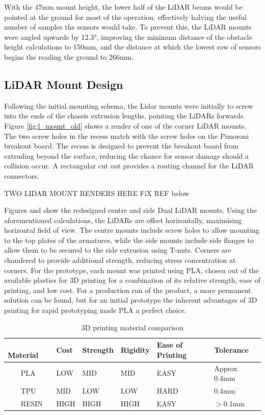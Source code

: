 \documentclass [12pt]{article}
\begin{document}
With the 47mm mount height, the lower half of the LiDAR beams would be pointed at the ground for most of the operation, effectively halving the useful number of samples the sensors would take. To prevent this, the LiDAR mounts were angled upwards by 12.3°,  improving the minimum distance of the obstacle height calculations to 150mm, and the distance at which the lowest row of sensors begins the reading the ground to 266mm.
\subsection{LiDAR Mount Design}


Following the initial mounting schema, the Lidar mounts were initially to screw into the ends of the chassis extrusion lengths, pointing the LiDARs forwards. Figure \ref{fig:l_mount_old} shows a render of one of the corner LiDAR mounts. The two screw holes in the recess match with the screw holes on the Pimoroni breakout board. The recess is designed to prevent the breakout board from extruding beyond the surface, reducing the chance for sensor damage should a collision occur. A rectangular cut out provides a routing channel for the LiDAR connectors.

TWO LIDAR MOUNT RENDERS HERE FiX REF below

Figures  and  show the redesigned centre and side Dual LiDAR mounts. Using the aforementioned calculations, the LiDARs are offset horizontally, maximising horizontal field of view. The centre mounts include screw holes to allow mounting to the top plates of the armatures, while the side mounts include side flanges to allow them to be secured to the side extrusion using T-nuts. Corners are chamfered to provide additional strength, reducing stress concentration at corners\cite{BELINGARDI2002273}.
For the prototype, each mount was printed using PLA, chosen out of the available plastics for 3D printing for a combination of its relative strength, ease of printing, and low cost. For a production run of the product, a more permanent solution can be found, but for an initial prototype the inherent advantages of 3D printing for rapid prototyping made PLA a perfect choice.

\begin{table}
    \begin{tabular}
    {|p{2.1cm}|p{1.8cm}|p{2.1cm}|p{2.1cm}|p{3.1cm}|p{3.2cm}|}
    \hline
        Material & Cost & Strength & Rigidity & Ease of Printing & Tolerance \\ \hline
        PLA & LOW & MID & MID & EASY & Approx 0.4mm\\ \hline
        TPU & MID & LOW & LOW & HARD & 0.4mm\\\hline
        RESIN & HIGH & HIGH & HIGH & EASY & $>$0.1mm\\\hline
    \end{tabular}\\
    \caption{3D printing material comparison}
    \end{table}
\end{document}
